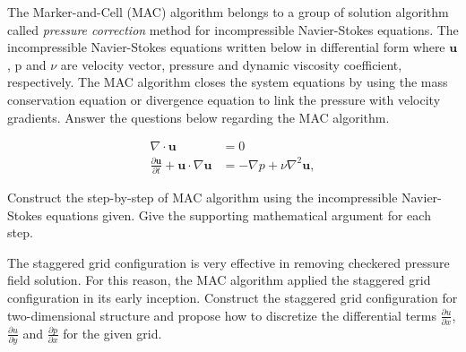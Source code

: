 \clearpage		%
\question{}

The Marker-and-Cell (MAC) algorithm belongs to a group of solution algorithm called \textit{pressure correction} method for incompressible Navier-Stokes equations. The incompressible Navier-Stokes equations written below in differential form where $\textbf{u}$, p and $\nu$ are velocity vector, pressure and dynamic viscosity coefficient, respectively. The MAC algorithm closes the system equations by using the mass conservation equation or divergence equation to link the pressure with velocity gradients. Answer the questions below regarding the MAC algorithm.   

\begin{subequations}
\begin{align}
\nabla \cdot \textbf{u} &= 0 \nonumber  \\ \nonumber
\frac{\partial \textbf{u}}{\partial t} + \textbf{u} \cdot \nabla \textbf{u}  &= -\nabla p + \nu \nabla^2 \textbf{u},
\end{align}
\end{subequations}

\listbeginx	%
	\item Construct the step-by-step of MAC algorithm using the incompressible Navier-Stokes equations given. Give the supporting mathematical argument for each step.  	
	
	
		
	
	
	\item The staggered grid configuration is very effective in removing checkered pressure field solution. For this reason, the MAC algorithm applied the staggered grid configuration in its early inception. Construct the staggered grid configuration for two-dimensional structure and propose how to discretize the differential terms $\frac{\partial u}{\partial x}$, $\frac{\partial u}{\partial y}$ and $\frac{\partial p}{\partial x}$ for the given grid.       

	

